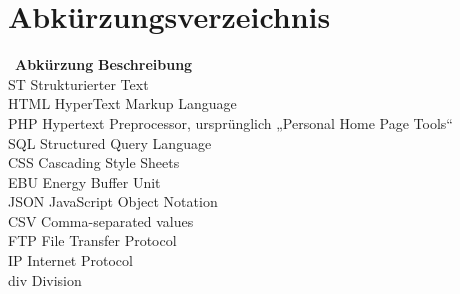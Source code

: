 
\chapter*{Abkürzungsverzeichnis}\thispagestyle{fancy}

\begin{tabbing}
\ \= \textbf{Abkürzung} \hspace{0.5cm} \= \textbf{Beschreibung} \kill
\\
\> ST \>   Strukturierter Text\\
\> HTML \>  HyperText Markup Language \\
\> PHP \>   Hypertext Preprocessor, ursprünglich „Personal Home Page Tools“\\
\> SQL \>   Structured Query Language\\
\> CSS \>   Cascading Style Sheets\\
\> EBU \>   Energy Buffer Unit\\
\> JSON \>  JavaScript Object Notation\\
\> CSV \>   Comma-separated values\\
\> FTP \>   File Transfer Protocol\\
\> IP \>   Internet Protocol\\
\> div \>   Division\\

\end{tabbing}
